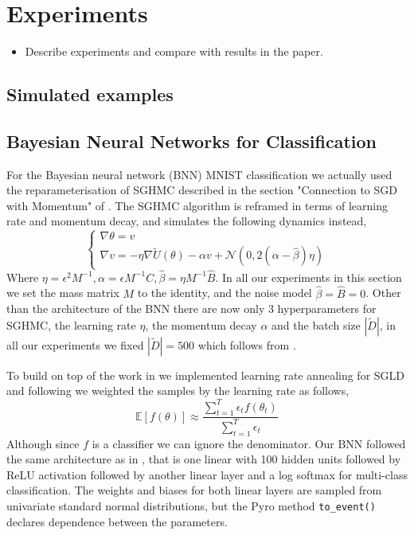 
\section{Experiments}

\begin{itemize}
    \item Describe experiments and compare with results in the paper.
\end{itemize}

\subsection{Simulated examples}

\subsection{Bayesian Neural Networks for Classification}
For the Bayesian neural network (BNN) MNIST classification we actually used the reparameterisation of SGHMC described in the section "Connection to SGD with Momentum" of \cite{sghmc}. The SGHMC algorithm is reframed in terms of learning rate and momentum decay, and simulates the following dynamics instead,
$$\begin{cases}
\nabla \theta = v\\
\nabla v = - \eta \nabla \tilde{U}(\theta) - \alpha v + \mathcal{N}(0, 2(\alpha - \hat{\beta}) \eta)
\end{cases}
$$
Where $\eta = \epsilon^2 M^{-1}, \alpha = \epsilon M^{-1}C, \hat{\beta} = \eta M^{-1}\hat{B}$. In all our experiments in this section we set the mass matrix $M $ to the identity, and the noise model $\hat{\beta} = \hat{B} = 0$. Other than the architecture of the BNN there are now only 3 hyperparameters for SGHMC, the learning rate $\eta$, the momentum decay $\alpha$ and the batch size $|\tilde{D}|$, in all our experiments we fixed $|\tilde{D}| = 500$ which follows from \cite{sghmc}.

To build on top of the work in \cite{sghmc} we implemented learning rate annealing for SGLD and following \cite{sgld} we weighted the samples by the learning rate as follows,
$$\mathbb{E}[f(\theta)] \approx \frac{\sum^T_{t=1} \epsilon_t f(\theta_t)}{\sum^T_{t=1} \epsilon_t}$$
Although since $f$ is a classifier we can ignore the denominator. Our BNN followed the same architecture as in \cite{sghmc}, that is one linear with 100 hidden units followed by ReLU activation followed by another linear layer and a log softmax for multi-class classification. The weights and biases for both linear layers are sampled from univariate standard normal distributions, but the Pyro method \texttt{to\_event()} declares dependence between the parameters. 

